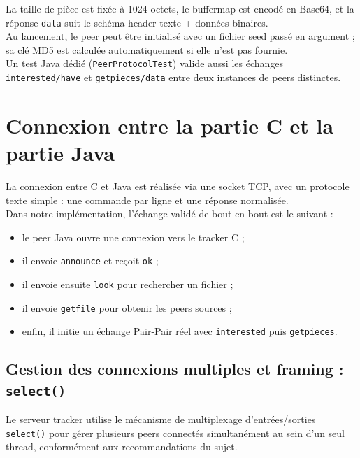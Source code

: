 \documentclass[12pt,a4paper]{article}
\begin{document}
\vspace{0.5em}
La taille de pièce est fixée à 1024 octets, le buffermap est encodé en Base64, et la réponse \texttt{data} suit le schéma header texte + données binaires.\\

Au lancement, le peer peut être initialisé avec un fichier seed passé en argument ; sa clé MD5 est calculée automatiquement si elle n’est pas fournie.\\

Un test Java dédié (\texttt{PeerProtocolTest}) valide aussi les échanges \texttt{interested/have} et \texttt{getpieces/data} entre deux instances de peers distinctes.

\section{Connexion entre la partie C et la partie Java}

La connexion entre C et Java est réalisée via une socket TCP, avec un protocole texte simple : une commande par ligne et une réponse normalisée.\\

Dans notre implémentation, l’échange validé de bout en bout est le suivant :
\begin{itemize}[leftmargin=1.2cm]
  \item le peer Java ouvre une connexion vers le tracker C ;
  \item il envoie \texttt{announce} et reçoit \texttt{ok} ;
  \item il envoie ensuite \texttt{look} pour rechercher un fichier ;
  \item il envoie \texttt{getfile} pour obtenir les peers sources ;
  \item enfin, il initie un échange Pair-Pair réel avec \texttt{interested} puis \texttt{getpieces}.
\end{itemize}


\subsection{Gestion des connexions multiples et framing : \texttt{select()}}

Le serveur tracker utilise le mécanisme de multiplexage d'entrées/sorties \texttt{select()}
pour gérer plusieurs peers connectés simultanément au sein d'un seul thread, conformément 
aux recommandations du sujet.\\
\end{document}
